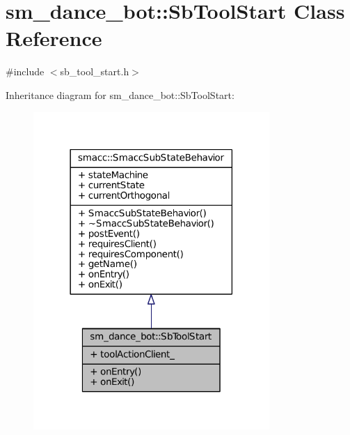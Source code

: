 \hypertarget{classsm__dance__bot_1_1SbToolStart}{}\section{sm\+\_\+dance\+\_\+bot\+:\+:Sb\+Tool\+Start Class Reference}
\label{classsm__dance__bot_1_1SbToolStart}


{\ttfamily \#include $<$sb\+\_\+tool\+\_\+start.\+h$>$}



Inheritance diagram for sm\+\_\+dance\+\_\+bot\+:\+:Sb\+Tool\+Start\+:
\nopagebreak
\begin{figure}[H]
\begin{center}
\leavevmode
\includegraphics[width=254pt]{classsm__dance__bot_1_1SbToolStart__inherit__graph}
\end{center}
\end{figure}


